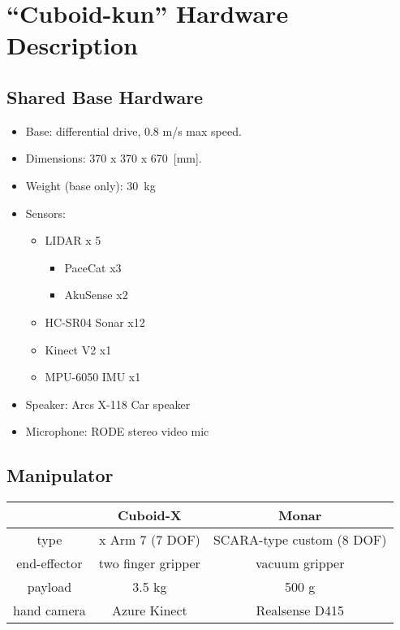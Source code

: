 \section*{``Cuboid-kun'' Hardware Description}
\label{sec:annex-OPL}

\subsection*{Shared Base Hardware}
\begin{itemize}
    \item Base: differential drive, 0.8 m/s max speed.
    \item Dimensions: 370 x 370 x 670~[mm].
    \item Weight (base only): 30~kg
    \item Sensors:
          \begin{itemize}
              \item LIDAR x 5
                    \begin{itemize}
                        \item PaceCat x3
                        \item AkuSense x2
                    \end{itemize}
              \item HC-SR04 Sonar x12
              \item Kinect V2 x1
              \item MPU-6050 IMU x1
          \end{itemize}
    \item Speaker: Arcs X-118 Car speaker
    \item Microphone: RODE stereo video mic
\end{itemize}

\subsection*{Manipulator}

\begin{table}[h]
    \centering
    \begin{tabular}{c|c|c}
                     & Cuboid-X           & Monar                     \\ \hline
        type         & x Arm 7 (7 DOF)    & SCARA-type custom (8 DOF) \\
        end-effector & two finger gripper & vacuum gripper            \\
        payload      & 3.5 kg             & 500 g                     \\
        hand camera  & Azure Kinect       & Realsense D415            \\
    \end{tabular}
\end{table}

